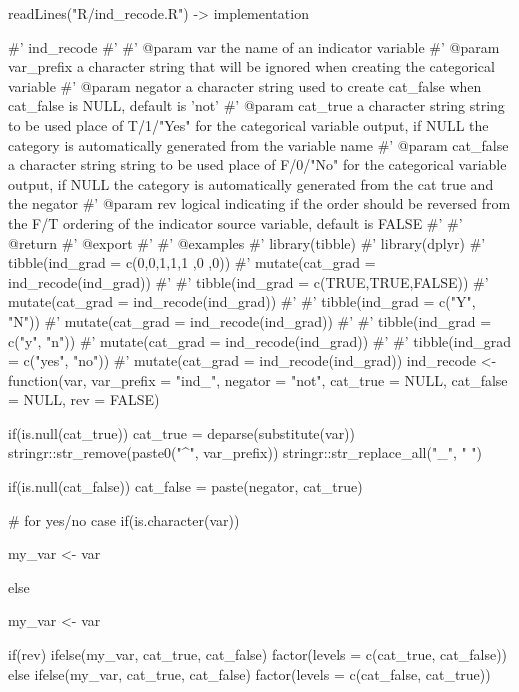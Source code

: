 \begin{Schunk}
\begin{Sinput}
readLines("R/ind_recode.R") -> implementation
\end{Sinput}
\end{Schunk}

\begin{Schunk}
\begin{Sinput}
#' ind_recode
#'
#' @param var the name of an indicator variable
#' @param var_prefix a character string that will be ignored when creating the categorical variable
#' @param negator a character string used to create cat_false when cat_false is NULL, default is 'not'
#' @param cat_true a character string string to be used place of  T/1/"Yes" for the categorical variable output, if NULL the category is automatically generated from the variable name
#' @param cat_false a character string string to be used place of  F/0/"No" for the categorical variable output, if NULL the category is automatically generated from the cat true and the negator
#' @param rev logical indicating if the order should be reversed from the F/T ordering of the indicator source variable, default is FALSE
#'
#' @return
#' @export
#'
#' @examples
#' library(tibble)
#' library(dplyr)
#' tibble(ind_grad = c(0,0,1,1,1 ,0 ,0)) %
#'   mutate(cat_grad  = ind_recode(ind_grad))
#'
#' tibble(ind_grad = c(TRUE,TRUE,FALSE)) %
#'   mutate(cat_grad  = ind_recode(ind_grad))
#'
#' tibble(ind_grad = c("Y", "N")) %
#'   mutate(cat_grad  = ind_recode(ind_grad))
#'
#' tibble(ind_grad = c("y", "n")) %
#'   mutate(cat_grad  = ind_recode(ind_grad))
#'
#' tibble(ind_grad = c("yes", "no")) %
#'   mutate(cat_grad  = ind_recode(ind_grad))
ind_recode <- function(var, var_prefix = "ind_", negator = "not",
                       cat_true = NULL, cat_false = NULL, rev = FALSE){

  if(is.null(cat_true)){
    cat_true = deparse(substitute(var)) %
      stringr::str_remove(paste0("^", var_prefix)) %
      stringr::str_replace_all("_", " ")
  }

  if(is.null(cat_false)){
    cat_false = paste(negator, cat_true)
  }

  # for yes/no case
  if(is.character({{var}})){

    my_var <- {{var}} %

  }else{

    my_var <- {{var}}
  }

  if(rev){
    ifelse(my_var, cat_true, cat_false) %
      factor(levels = c(cat_true, cat_false))
  }else{
    ifelse(my_var, cat_true, cat_false) %
      factor(levels = c(cat_false, cat_true))
  }


}
\end{Sinput}
\end{Schunk}



\address{%
Evangeline Reynolds\\
Affiliation\\%
line 1\\ line 2\\
%
\url{https://journal.r-project.org}\\%
\textit{ORCiD: \href{https://orcid.org/0000-0002-9079-593X}{0000-0002-9079-593X}}\\%
\href{mailto:author1@work}{\nolinkurl{author1@work}}%
}

